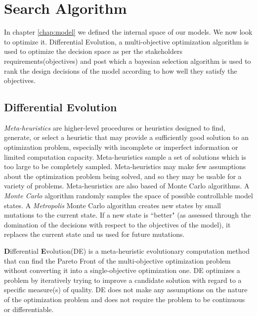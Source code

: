 \chapter{Search Algorithm}
\label{chap:sa}

In chapter \ref{chap:model} we defined the internal space of our models. We now look to optimize it. Differential Evolution, a multi-objective optimization algorithm is used to optimize the decision space as per the stakeholders requirements(objectives) and post which a bayesian selection algorithm is used to rank the design decisions of the model according to how well they satisfy the objectives.

\section{Differential Evolution}
\label{sec:sa:de}
\textit{Meta-heuristics} are higher-level procedures or heuristics designed to find, generate, or select a heuristic that may provide a sufficiently good solution to an optimization problem, especially with incomplete or imperfect information or limited computation capacity. Meta-heuristics sample a set of solutions which is too large to be completely sampled. Meta-heuristics may make few assumptions about the optimization problem being solved, and so they may be usable for a variety of problems. Meta-heuristics are also based of Monte Carlo algorithms. A \textit{Monte Carlo} algorithm randomly samples the space of possible controllable model states. A \textit{Metropolis} Monte Carlo algorithm \cite{metropolis53} creates new states by small mutations to the current state. If a new state is ``better" (as assessed through the domination of the decisions with respect to the objectives of the model), it replaces the current state and us used for future mutations.

\textbf{D}ifferential \textbf{E}volution(DE) is a meta-heuristic evolutionary computation method that can find the Pareto Front of the multi-objective optimization problem without converting it into a single-objective optimization one. DE optimizes a problem by iteratively trying to improve a candidate solution with regard to a specific measure(s) of quality. DE does not make any assumptions on the nature of the optimization problem and does not require the problem to be continuous or differentiable.


